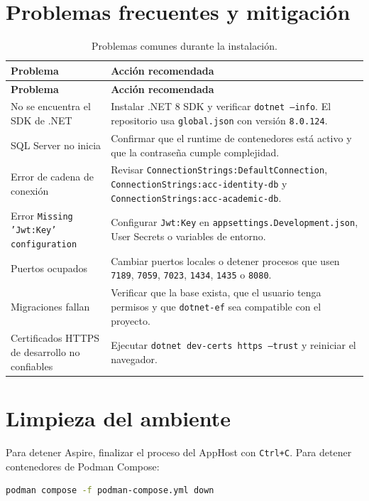 \documentclass[12pt,letterpaper]{article}
\begin{document}
\section{Problemas frecuentes y mitigaci\'on}

\begin{longtable}{p{}p{}}
\caption{Problemas comunes durante la instalaci\'on.}
\label{tab:problemas}\\
\toprule
\textbf{Problema} & \textbf{Acci\'on recomendada} \\
\midrule
\endfirsthead
\toprule
\textbf{Problema} & \textbf{Acci\'on recomendada} \\
\midrule
\endhead
No se encuentra el SDK de .NET & Instalar .NET 8 SDK y verificar \texttt{dotnet --info}. El repositorio usa \texttt{global.json} con versi\'on \texttt{8.0.124}. \\
SQL Server no inicia & Confirmar que el runtime de contenedores est\'a activo y que la contrase\~na cumple complejidad. \\
Error de cadena de conexi\'on & Revisar \texttt{ConnectionStrings:DefaultConnection}, \texttt{ConnectionStrings:acc-identity-db} y \texttt{ConnectionStrings:acc-academic-db}. \\
Error \texttt{Missing 'Jwt:Key' configuration} & Configurar \texttt{Jwt:Key} en \texttt{appsettings.Development.json}, User Secrets o variables de entorno. \\
Puertos ocupados & Cambiar puertos locales o detener procesos que usen \texttt{7189}, \texttt{7059}, \texttt{7023}, \texttt{1434}, \texttt{1435} o \texttt{8080}. \\
Migraciones fallan & Verificar que la base exista, que el usuario tenga permisos y que \texttt{dotnet-ef} sea compatible con el proyecto. \\
Certificados HTTPS de desarrollo no confiables & Ejecutar \texttt{dotnet dev-certs https --trust} y reiniciar el navegador. \\
\bottomrule
\end{longtable}

\section{Limpieza del ambiente}

Para detener Aspire, finalizar el proceso del AppHost con \texttt{Ctrl+C}. Para detener contenedores de Podman Compose:

\begin{lstlisting}[language=bash,caption={Detener servicios de Podman Compose.}]
podman compose -f podman-compose.yml down
\end{lstlisting}
\end{document}
